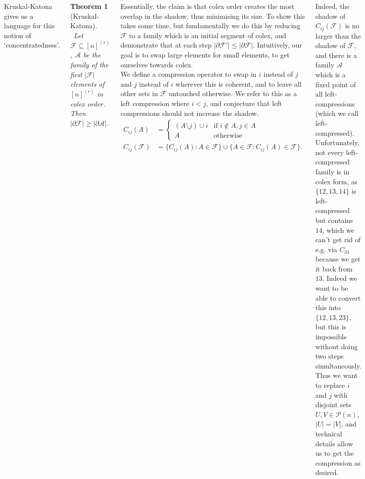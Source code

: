 \documentclass{tikzposter} %
\newcommand{\mc}{\mathcal}
\newtheorem{theorem}{Theorem}
\begin{document}
\begin{columns}
{{    Kruskal-Katona gives us a language for this notion of `concentratedness'. \\

    \begin{theorem}[Kruskal-Katona]
    \ Let $\mc{F} \subseteq [n]^{(r)}$, $\mc{A}$ be the family of the first $|\mc{F}|$ elements of $[n]^{(r)}$ in colex order. Then $|\partial \mc{F}| \ge |\partial \mc{A}|$.
    \end{theorem}
    \hphantom{}

    Essentially, the claim is that colex order creates the most overlap in the shadow, thus minimising its size. To show this takes some time, but fundamentally we do this by reducing $\mc{F}$ to a family which is an initial segment of colex, and demonstrate that at each step $|\partial \mc{F}'| \le |\partial \mc{F}|$. Intuitively, our goal is to swap large elements for small elements, to get ourselves towards colex. \\

    We define a compression operator to swap in $i$ instead of $j$ and $j$ instead of $i$ wherever this is coherent, and to leave all other sets in $\mc{F}$ untouched otherwise. We refer to this as a left compression where $i < j$, and conjecture that left compressions should not increase the shadow.
    \begin{align*}
      C_{ij}(A) &= \begin{cases}
        (A \setminus j) \cup i & \text{if }i \not\in A, j \in A \\
        A & \text{otherwise}
                 \end{cases} \\
      C_{ij}(\mc{F}) &= \{C_{ij}(A) : A \in \mc{F}\} \cup \{A \in \mc{F} : C_{ij}(A) \in \mc{F}\}.
    \end{align*}

    Indeed, the shadow of $C_{ij}(\mathcal{F})$ is no larger than the shadow of $\mc{F}$, and there is a family $\mc{A}$ which is a fixed point of all left-compressions (which we call left-compressed). Unfortunately, not every left-compressed family is in colex form, as $\{12, 13, 14\}$ is left-compressed but contains $14$, which we can't get rid of e.g. via $C_{34}$ because we get it back from $13$. Indeed we want to be able to convert this into $\{12, 13, 23\}$, but this is impossible without doing two steps simultaneously. \\

    Thus we want to replace $i$ and $j$ with disjoint sets $U, V \in \mc{P}(n)$, $|U| = |V|$, and technical details allow us to get the compression as desired. \\

}}
\end{columns}
\end{document}
